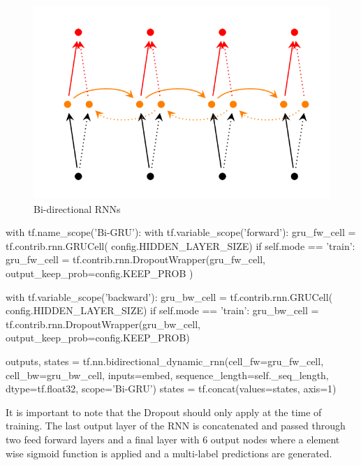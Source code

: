 \documentclass{article}
\begin{document}
    \begin{figure}
        \centering
        \includegraphics[scale=0.6]{bi_rnn.png}
        \caption{Bi-directional RNNs}
        \label{figure:bi-rnn}
    \end{figure}



    \begin{python}
    with tf.name_scope('Bi-GRU'):
    with tf.variable_scope('forward'):
        gru_fw_cell = tf.contrib.rnn.GRUCell(
            config.HIDDEN_LAYER_SIZE)
        if self.mode == 'train':
            gru_fw_cell = tf.contrib.rnn.DropoutWrapper(gru_fw_cell,
            output_keep_prob=config.KEEP_PROB )

    with tf.variable_scope('backward'):
        gru_bw_cell = tf.contrib.rnn.GRUCell(
            config.HIDDEN_LAYER_SIZE)
        if self.mode == 'train':
            gru_bw_cell = tf.contrib.rnn.DropoutWrapper(gru_bw_cell,
            output_keep_prob=config.KEEP_PROB)

        outputs, states = tf.nn.bidirectional_dynamic_rnn(cell_fw=gru_fw_cell,
                                                    cell_bw=gru_bw_cell,
                                                    inputs=embed,
                                                    sequence_length=self._seq_length,
                                                    dtype=tf.float32,
                                                    scope='Bi-GRU')
    states = tf.concat(values=states, axis=1)
    \end{python}

    It is important to note that the Dropout should only apply at the time of training. The last output layer of the RNN is concatenated and passed through two feed forward layers and a final layer with $6$ output nodes where a element wise sigmoid function is applied and a multi-label predictions are generated.
\end{document}
